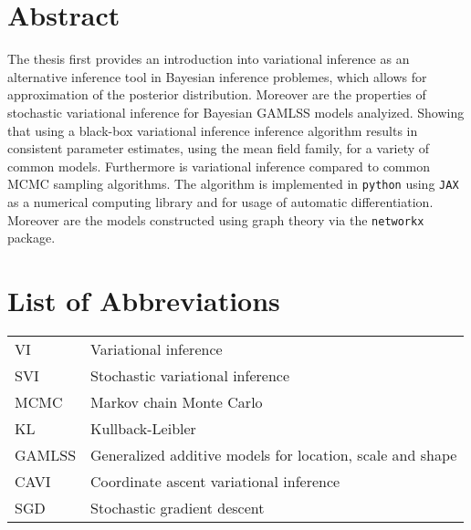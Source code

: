 \clearpage
{}


\section*{Abstract}

The thesis first provides an introduction into variational inference as an alternative
inference tool in Bayesian inference problemes, which allows for approximation of the posterior distribution.
Moreover are the properties of stochastic variational inference for Bayesian GAMLSS models analyized.
Showing that using a black-box variational inference inference algorithm results in
consistent parameter estimates, using the mean field family, for a variety of common models.
Furthermore is variational inference compared to common MCMC sampling algorithms. The algorithm is implemented in \verb|python|
using \verb|JAX| as a numerical computing library and for usage of automatic differentiation.
Moreover are the models constructed using graph theory via the \verb|networkx| package.

\clearpage

\tableofcontents
\clearpage

\listoffigures

\listoftables

\section*{List of Abbreviations}

\begin{tabular}{@{} l @{\hskip 1in} l}
  VI & Variational inference \\
  SVI & Stochastic variational inference \\
  MCMC & Markov chain Monte Carlo \\
  KL & Kullback-Leibler \\
  GAMLSS & Generalized additive models for location, scale and shape \\
  CAVI & Coordinate ascent variational inference \\
  SGD & Stochastic gradient descent \\
\end{tabular}
